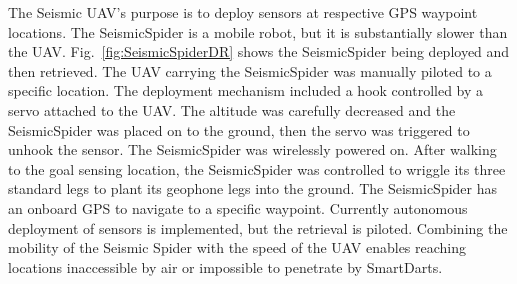 The Seismic UAV's purpose is to deploy sensors at respective GPS waypoint locations. The SeismicSpider is a mobile robot, but it is substantially slower than the UAV. Fig.~\ref{fig:SeismicSpiderDR} shows the SeismicSpider being deployed and then retrieved. The UAV carrying the SeismicSpider was manually piloted to a specific location. The deployment mechanism included a hook controlled by a servo attached to the UAV. The altitude was carefully decreased and the SeismicSpider was placed on to the ground, then the servo was triggered to unhook the sensor.  The SeismicSpider was wirelessly powered on. 
After walking to the goal sensing location, the SeismicSpider was controlled to wriggle its three standard legs to plant its geophone legs into the ground.  The SeismicSpider has an onboard GPS to navigate to a specific waypoint.  Currently autonomous deployment of sensors is implemented, but the retrieval is piloted. 
Combining the mobility of the Seismic Spider with the speed of the UAV enables reaching locations inaccessible by air or impossible to penetrate by SmartDarts.





